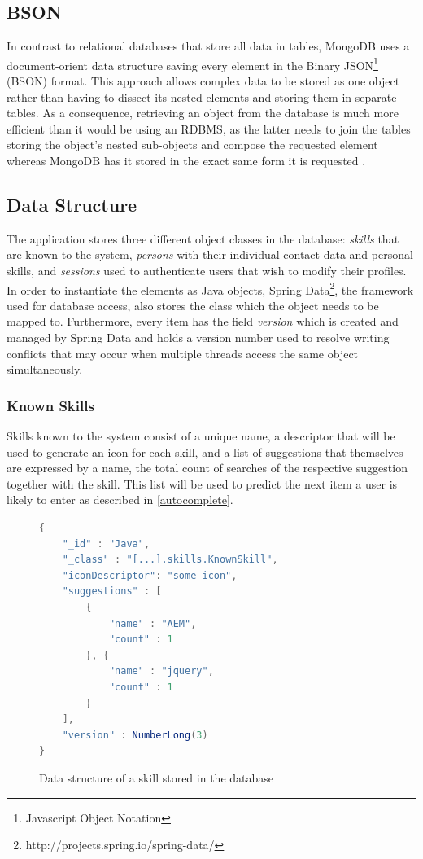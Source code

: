 \subsection{BSON}
\label{BSON}
In contrast to relational databases that store all data in tables, MongoDB uses a document-orient data structure saving every element in the Binary JSON\footnote{Javascript Object Notation} (BSON) format. This approach allows complex data to be stored as one object rather than having to dissect its nested elements and storing them in separate tables. As a consequence, retrieving an object from the database is much more efficient than it would be using an RDBMS, as the latter needs to join the tables storing the object's nested sub-objects and compose the requested element whereas MongoDB has it stored in the exact same form it is requested \cite[p. 10]{MongoGuide}.

\subsection{Data Structure}
The application stores three different object classes in the database: \textit{skills} that are known to the system, \textit{persons} with their individual contact data and personal skills, and \textit{sessions} used to authenticate users that wish to modify their profiles. In order to instantiate the elements as Java objects, Spring Data\footnote{http://projects.spring.io/spring-data/}, the framework used for database access, also stores the class which the object needs to be mapped to. Furthermore, every item has the field \textit{version} which is created and managed by Spring Data and holds a version number used to resolve writing conflicts that may occur when multiple threads access the same object simultaneously.

\newpage
\subsubsection{Known Skills}
Skills known to the system consist of a unique name, a descriptor that will be used to generate an icon for each skill, and a list of suggestions that themselves are expressed by a name, the total count of searches of the respective suggestion together with the skill. This list will be used to predict the next item a user is likely to enter as described in \ref{autocomplete}.
\begin{figure}[h]
\begin{lstlisting}[language=Java]
{
	"_id" : "Java",
	"_class" : "[...].skills.KnownSkill",
	"iconDescriptor": "some icon",
	"suggestions" : [
		{
			"name" : "AEM",
			"count" : 1
		}, {
			"name" : "jquery",
			"count" : 1
		}
	],
	"version" : NumberLong(3)
}
\end{lstlisting}
\caption[Data Structure: Skill]{Data structure of a skill stored in the database}
\end{figure}

